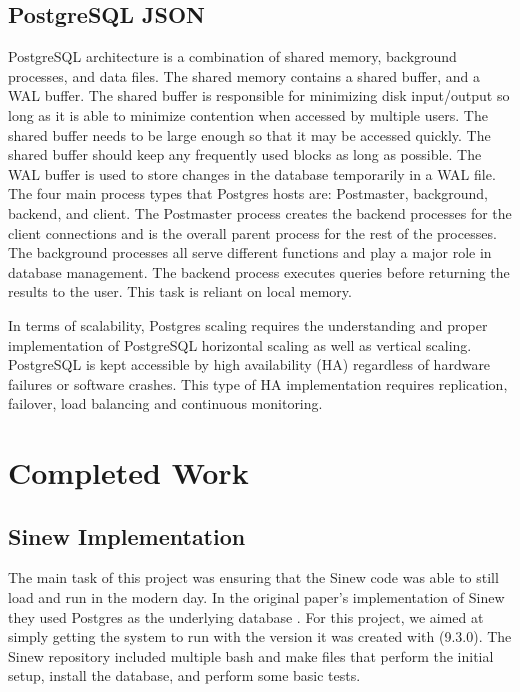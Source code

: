 \documentclass[sigconf]{acmart}
\begin{document}
   \subsection{PostgreSQL JSON}
    PostgreSQL architecture \cite{PostgresMedium} is a combination of shared memory, background processes, and data files. The shared memory contains a shared buffer, and a WAL buffer. The shared buffer is responsible for minimizing disk input/output so long as it is able to minimize contention when accessed by multiple users. The shared buffer needs to be large enough so that it may be accessed quickly. The shared buffer should keep any frequently used blocks as long as possible. The WAL buffer is used to store changes in the database temporarily in a WAL file. The four main process types that Postgres hosts are: Postmaster, background, backend, and client. The Postmaster process creates the backend processes for the client connections and is the overall parent process for the rest of the processes. The background processes all serve different functions and play a major role in database management. The backend process executes queries before returning the results to the user. This task is reliant on local memory.

    In terms of scalability, Postgres scaling\cite{Postgres-scalable} requires the understanding and proper implementation of PostgreSQL horizontal scaling as well as vertical scaling. PostgreSQL is kept accessible by high availability (HA) regardless of hardware failures or software crashes. This type of HA implementation requires replication, failover, load balancing and continuous monitoring.


\section{Completed Work}
    \subsection{Sinew Implementation}
    The main task of this project was ensuring that the Sinew code was able to still load and run in the modern day. In the original paper's implementation of Sinew they used Postgres as the underlying database \cite{Tahara_Diamond_Abadi_2014}. For this project, we aimed at simply getting the system to run with the version it was created with (9.3.0). The Sinew repository included multiple bash and make files that perform the initial setup, install the database, and perform some basic tests.
\end{document}
